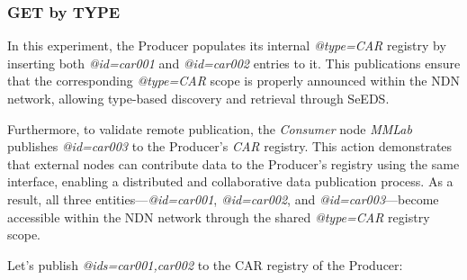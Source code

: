 \documentclass{article}
\begin{document}
\subsubsection{GET by TYPE}

In this experiment, the Producer populates its internal \textit{@type=CAR} registry by inserting both \textit{@id=car001} and \textit{@id=car002} entries to it. This publications ensure that the corresponding \textit{@type=CAR} scope is properly announced within the NDN network, allowing type-based discovery and retrieval through SeEDS.

Furthermore, to validate remote publication, the \emph{Consumer} node \textit{MMLab} publishes \textit{@id=car003} to the Producer’s \textit{CAR} registry. This action demonstrates that external nodes can contribute data to the Producer’s registry using the same interface, enabling a distributed and collaborative data publication process. As a result, all three entities—\textit{@id=car001}, \textit{@id=car002}, and \textit{@id=car003}—become accessible within the NDN network through the shared \textit{@type=CAR} registry scope.

Let's publish \textit{@ids=car001,car002} to the CAR registry of the Producer:
\end{document}
